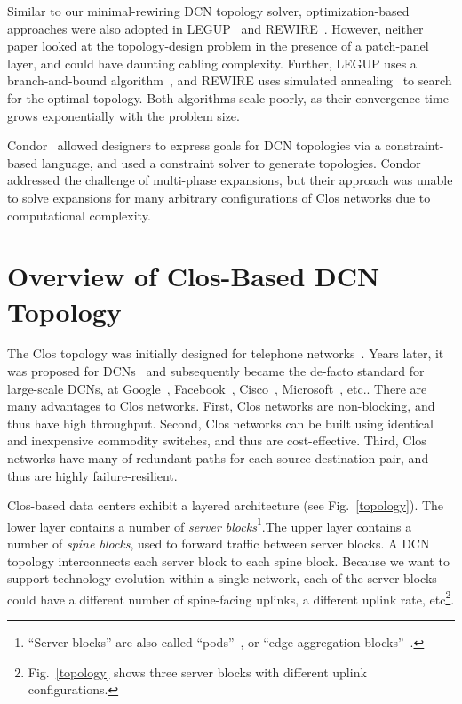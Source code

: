 \documentclass[letterpaper,twocolumn,10pt]{article}
\begin{document}
Similar to our minimal-rewiring DCN topology solver, optimization-based approaches were also adopted in LEGUP~\cite{LegUpDcn} and REWIRE~\cite{RewireDcn}. However, neither paper looked at the topology-design problem in the presence of a patch-panel layer, and could have daunting cabling complexity. Further, LEGUP uses a branch-and-bound algorithm~\cite{BranchAndBound}, and REWIRE uses simulated annealing~\cite{SimulatedAnnealing} to search for the optimal topology. Both algorithms scale poorly, as their convergence time grows exponentially with the problem size.

Condor~\cite{Condor} allowed designers to express goals for DCN topologies via a constraint-based language, and used a constraint solver to generate topologies.   Condor addressed the challenge of multi-phase expansions, but their approach was unable to solve expansions for many arbitrary configurations of Clos networks due to computational complexity.


\section{Overview of Clos-Based DCN Topology}
The Clos topology was initially designed for telephone networks~\cite{Clos}. Years later, it was proposed for DCNs~\cite{FatTree} and subsequently became the de-facto standard for large-scale DCNs, at Google~\cite{JupiterRising}, Facebook~\cite{FacebookDcn}, Cisco~\cite{CiscoDcn}, Microsoft~\cite{VL2}, etc.. There are many advantages to Clos networks. First, Clos networks are non-blocking, and thus have high throughput. Second, Clos networks can be built using identical and inexpensive commodity switches, and thus are cost-effective. Third, Clos networks have many of redundant paths for each source-destination pair, and thus are highly failure-resilient.

Clos-based data centers exhibit a layered architecture (see Fig.~\ref{topology}). The lower layer contains a number of \emph{server blocks}\footnote{``Server blocks'' are also called ``pods''~\cite{HybridDataCenter}, or ``edge aggregation blocks''~\cite{JupiterRising}.}.The upper layer contains a number of \emph{spine blocks}, used to forward traffic between server blocks. A DCN topology interconnects each server block to each spine block.  Because we want to support technology evolution within a single network, each of the server blocks could have a different number of spine-facing uplinks, a different uplink rate, etc\footnote{Fig.~\ref{topology} shows three server blocks with different uplink configurations.}.
\end{document}
